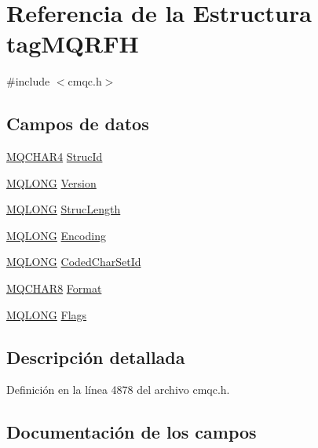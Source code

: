 \hypertarget{structtag_m_q_r_f_h}{}\section{Referencia de la Estructura tag\+M\+Q\+R\+F\+H}
\label{structtag_m_q_r_f_h}


{\ttfamily \#include $<$cmqc.\+h$>$}

\subsection*{Campos de datos}
\begin{DoxyCompactItemize}
\item 
\hyperlink{cmqc_8h_a12590e546ed66fda7cf21c1d5cefa31d}{M\+Q\+C\+H\+A\+R4} \hyperlink{structtag_m_q_r_f_h_a0530922ca944569b52601d74941f96e4}{Struc\+Id}
\item 
\hyperlink{cmqc_8h_a1fb8d28cbda3fa8766a9821230cdb6d5}{M\+Q\+L\+O\+N\+G} \hyperlink{structtag_m_q_r_f_h_a0656ef8f766b3907d394d88a35d7b7e9}{Version}
\item 
\hyperlink{cmqc_8h_a1fb8d28cbda3fa8766a9821230cdb6d5}{M\+Q\+L\+O\+N\+G} \hyperlink{structtag_m_q_r_f_h_a830af9a4a08c015b9a4b2d39d4d3420a}{Struc\+Length}
\item 
\hyperlink{cmqc_8h_a1fb8d28cbda3fa8766a9821230cdb6d5}{M\+Q\+L\+O\+N\+G} \hyperlink{structtag_m_q_r_f_h_a30167bf454a49a60fd3fe4e9e586af34}{Encoding}
\item 
\hyperlink{cmqc_8h_a1fb8d28cbda3fa8766a9821230cdb6d5}{M\+Q\+L\+O\+N\+G} \hyperlink{structtag_m_q_r_f_h_a4d8d1961a991850d1355cdf9b4680b8e}{Coded\+Char\+Set\+Id}
\item 
\hyperlink{cmqc_8h_abddcedb8c41fa262f2bd05dfec3e60a5}{M\+Q\+C\+H\+A\+R8} \hyperlink{structtag_m_q_r_f_h_a435a478822008713f8aaff89f369ed63}{Format}
\item 
\hyperlink{cmqc_8h_a1fb8d28cbda3fa8766a9821230cdb6d5}{M\+Q\+L\+O\+N\+G} \hyperlink{structtag_m_q_r_f_h_a8da770267273b200fa9c968fa2a0da57}{Flags}
\end{DoxyCompactItemize}


\subsection{Descripción detallada}


Definición en la línea 4878 del archivo cmqc.\+h.



\subsection{Documentación de los campos}
\hypertarget{structtag_m_q_r_f_h_a4d8d1961a991850d1355cdf9b4680b8e}{}
